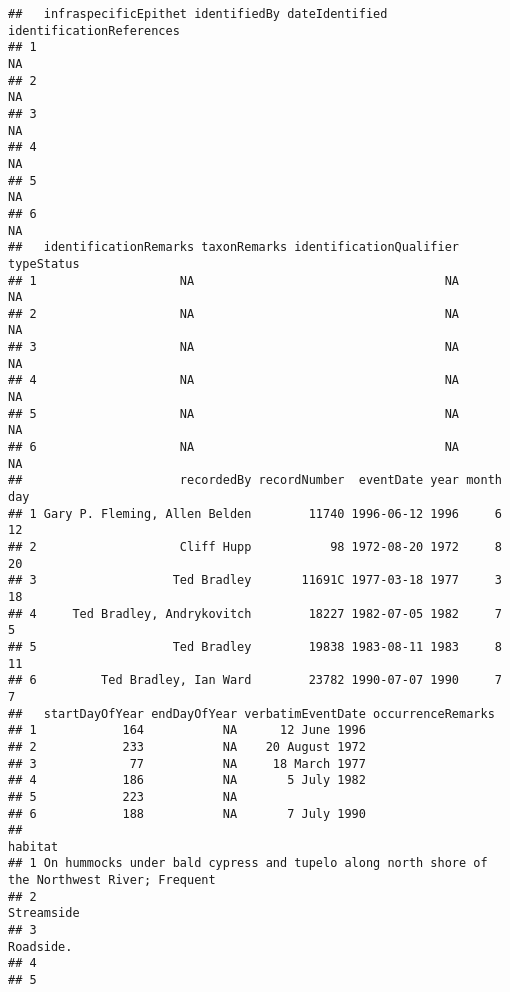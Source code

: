 \documentclass[
]{article}
\begin{document}
\begin{verbatim}
##   infraspecificEpithet identifiedBy dateIdentified identificationReferences
## 1                                                                        NA
## 2                                                                        NA
## 3                                                                        NA
## 4                                                                        NA
## 5                                                                        NA
## 6                                                                        NA
##   identificationRemarks taxonRemarks identificationQualifier typeStatus
## 1                    NA                                   NA         NA
## 2                    NA                                   NA         NA
## 3                    NA                                   NA         NA
## 4                    NA                                   NA         NA
## 5                    NA                                   NA         NA
## 6                    NA                                   NA         NA
##                      recordedBy recordNumber  eventDate year month day
## 1 Gary P. Fleming, Allen Belden        11740 1996-06-12 1996     6  12
## 2                    Cliff Hupp           98 1972-08-20 1972     8  20
## 3                   Ted Bradley       11691C 1977-03-18 1977     3  18
## 4     Ted Bradley, Andrykovitch        18227 1982-07-05 1982     7   5
## 5                   Ted Bradley        19838 1983-08-11 1983     8  11
## 6         Ted Bradley, Ian Ward        23782 1990-07-07 1990     7   7
##   startDayOfYear endDayOfYear verbatimEventDate occurrenceRemarks
## 1            164           NA      12 June 1996                  
## 2            233           NA    20 August 1972                  
## 3             77           NA     18 March 1977                  
## 4            186           NA       5 July 1982                  
## 5            223           NA                                    
## 6            188           NA       7 July 1990                  
##                                                                                        habitat
## 1 On hummocks under bald cypress and tupelo along north shore of the Northwest River; Frequent
## 2                                                                                   Streamside
## 3                                                                                    Roadside.
## 4                                                                                             
## 5                                                                                             

\end{verbatim}
\end{document}
